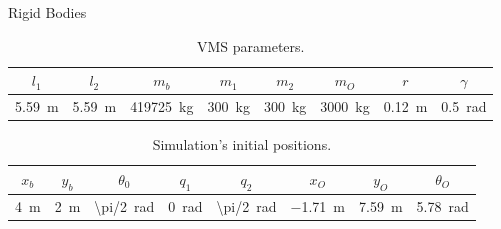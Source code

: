 \begin{frame}{Rigid Bodies}
    \begin{table}
        \caption{VMS parameters.}
        \begin{center}
        \begin{tabular}{cccccccc}
            \hline
            $l_1$&$l_2$&$m_b$&$m_1$&$m_2$&$m_O$&$r$&$\gamma$\\
        \hline
            \SI{5.59}{\metre}&\SI{5.59}{\metre}&\SI{419725}{\kilogram}&\SI{300}{\kilogram}&\SI{300}{\kilogram}&\SI{3000}{\kilogram}&\SI{0.12}{\metre}&\SI{0.5}{\radian}\\
        \hline
        \end{tabular}
        \end{center}
        \end{table}
        \begin{table}
        \caption{Simulation's initial positions.}
        \begin{center}
        \begin{tabular}{cccccccc}
            \hline
            $x_b$&$y_b$&$\theta_0$&$q_1$&$q_2$&$x_O$&$y_O$&$\theta_O$\\
        \hline
            \SI{4}{\metre}&\SI{2}{\metre}&\SI[parse-numbers = false]{\pi/2}{\radian}&\SI{0}{\radian}&\SI[parse-numbers = false]{\pi/2}{\radian}&\SI{-1.71}{\metre}&\SI{7.59}{\metre}&\SI{5.78}{\radian}\\
        \hline
        \end{tabular}
        \end{center}
        \end{table}
\end{frame}


